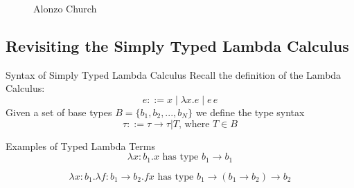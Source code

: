 \documentclass[
	aspectratio=169, %
	8pt, %
]{beamer}
\begin{document}
\begin{frame}{\insertsubsection}
\begin{fancycolumns}[columns=4]
\begin{figure}
									\caption{Alonzo Church}
							\end{figure}
		\end{fancycolumns}
\end{frame}


\subsection{Revisiting the Simply Typed Lambda Calculus}
\begin{frame}{\insertsubsection}
		\begin{definition}{Syntax of Simply Typed Lambda Calculus}
				Recall the definition of the Lambda Calculus:
				\begin{equation}
						e ::= x \; | \; \lambda x.e \; | \; e \, e 
				\end{equation}
						Given a set of base types $B = \{b_1,b_2,...,b_N \}$ we define the type syntax
				\begin{equation}
								\tau ::= \tau \rightarrow \tau | T \text{, where } T \in B
				\end{equation}
		\end{definition}

		\pause 

		\begin{example}{Examples of Typed Lambda Terms}
				\begin{equation*}
								\lambda x : b_1 . x \text{ has type } b_1 \rightarrow b_1
				\end{equation*}

				\begin{equation*}
								\lambda x : b_1 . \lambda f : b_1 \rightarrow b_2 . f x \text{ has type } b_1 \rightarrow (b_1 \rightarrow b_2) \rightarrow b_2
				\end{equation*}

		\end{example}

\end{frame}
\end{document}
